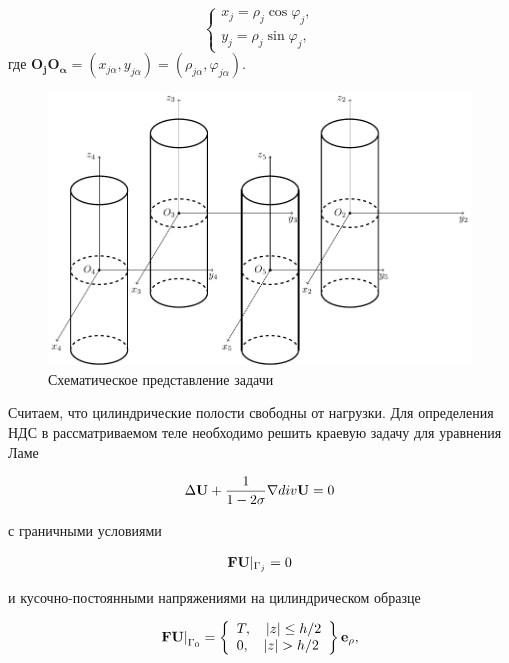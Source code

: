 \begin{equation}
\left\{ \begin{array}{l}
{x_j} = {\rho _j}\cos {\varphi _j},\\
{y_j} = {\rho _j}\sin {\varphi _j},
\end{array} \right.
\label{eq:7:26}
\end{equation}
где $\mathbf{O_jO_\alpha}=(x_{j\alpha},y_{j\alpha})=(\rho_{j\alpha},\varphi_{j\alpha})$.
 
\begin{figure}
\centering\includegraphics[width=12cm]{cylinders-4.pdf}
\caption{Схематическое представление задачи}
\label{fig:cyl-4a}
\end{figure}

Считаем, что цилиндрические полости свободны от нагрузки. Для определения НДС в рассматриваемом теле необходимо решить краевую задачу для уравнения Ламе

\begin{equation}
\Delta {\bf{U}} + \frac{1}{{1 - 2\sigma }}\nabla div{\bf{U}} = 0
\label{eq:7:27}
\end{equation}

\noindent с граничными условиями

\begin{equation}
{\bf{FU}}{|_{{\Gamma _j}}} = 0
\label{eq:7:18}
\end{equation}

\noindent и кусочно-постоянными напряжениями на цилиндрическом образце

\begin{equation}
{\left. {{\bf{FU}}} \right|_{{\Gamma _0}}} = \left\{ \begin{array}{l}
T,\;\;\;{\mkern 1mu} {\kern 1pt} |z| \le h/2\\
0,\;\;\;{\mkern 1mu} {\kern 1pt} |z| > h/2
\end{array} \right\}{{\bf{e}}_\rho },
\label{eq:7:19}
\end{equation}

